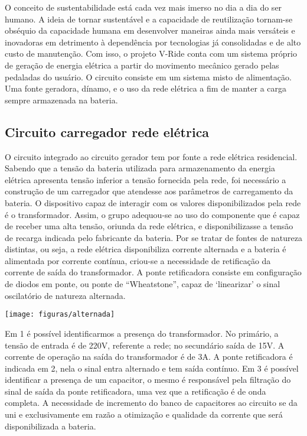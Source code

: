 O conceito de sustentabilidade está cada vez mais imerso no dia a dia do ser humano. A ideia de tornar sustentável e a capacidade de reutilização tornam-se obséquio da capacidade humana em desenvolver maneiras ainda mais versáteis e inovadoras em detrimento à dependência por tecnologias já consolidadas e de alto custo de manutenção. Com isso, o projeto V-Ride conta com um sistema próprio de geração de energia elétrica a partir do movimento mecânico gerado pelas pedaladas do usuário.
O circuito consiste em um sistema misto de alimentação. Uma fonte geradora, dínamo, e o uso da rede elétrica a fim de manter a carga sempre armazenada na bateria.

\subsection{Circuito carregador rede elétrica}

O circuito integrado ao circuito gerador tem por fonte a rede elétrica residencial. Sabendo que a tensão da bateria utilizada para armazenamento da energia elétrica apresenta tensão inferior a tensão fornecida pela rede, foi necessário a construção de um carregador que atendesse aos parâmetros de carregamento da bateria.
O dispositivo capaz de interagir com os valores disponibilizados pela rede é o transformador. Assim, o grupo adequou-se ao uso do componente que é capaz de receber uma alta tensão, oriunda da rede elétrica, e disponibilizasse a tensão de recarga indicada pelo fabricante da bateria. Por se tratar de fontes de natureza distintas, ou seja, a rede elétrica disponibiliza corrente alternada e a bateria é alimentada por corrente contínua, criou-se a necessidade de retificação da corrente de saída do transformador. A ponte retificadora consiste em configuração de diodos em ponte, ou ponte de “Wheatstone”, capaz de ‘linearizar’ o sinal oscilatório de natureza alternada.


 \begin{center}
    	\texttt{[image: figuras/alternada]}
        \label{alternada}
    \end{center}

Em 1 é possível identificarmos a presença do transformador. No primário, a tensão de entrada é de 220V, referente a rede; no secundário saída de 15V. A corrente de operação na saída do transformador é de 3A. A ponte retificadora é indicada em 2, nela o sinal entra alternado e tem saída contínuo. Em 3 é possível identificar a presença de um capacitor, o mesmo é responsável pela filtração do sinal de saída da ponte retificadora, uma vez que a retificação é de onda completa. A necessidade de incremento do banco de capacitores ao circuito se da uni e exclusivamente em razão a otimização e qualidade da corrente que será disponibilizada a bateria.

